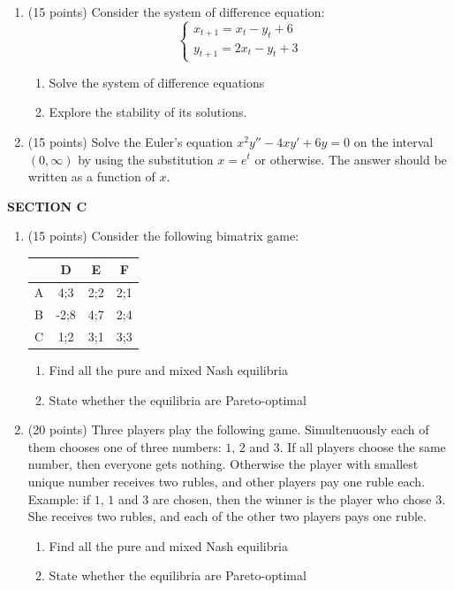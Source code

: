 \documentclass[12pt]{article} %
\theoremstyle{definition} %
\begin{document}
\begin{enumerate}[resume]
\item (15 points)  Consider the system of difference equation:
\[
\begin{cases}
x_{t+1}=x_t-y_t+6 \\
y_{t+1}=2x_t-y_t+3
\end{cases}
\]

\begin{enumerate}
\item Solve the system of difference equations
\item Explore the stability of its solutions.
\end{enumerate}

\item   (15 points)   Solve the  Euler’s equation $x^2y''-4xy'+6y=0$ on the interval $(0,\infty)$ by using the substitution $x=e^t$ or otherwise. 
The answer should be written as a function of $x$.

\end{enumerate}


\textbf{SECTION C}

\begin{enumerate}[resume]
\item  (15 points)   Consider the following bimatrix game:


\begin{tabular}{c|ccc}
 & D & E & F \\
\hline
A & 4;3 & 2;2 & 2;1  \\
B & -2;8 & 4;7 & 2;4  \\
C & 1;2 & 3;1 & 3;3  \\
\end{tabular}

\begin{enumerate}
\item Find all the pure and mixed Nash equilibria
\item State whether the equilibria are Pareto-optimal
\end{enumerate}

\item  (20 points)  Three players play the following game. Simultenuously each of them chooses one of three numbers: $1$, $2$ and $3$. If all players choose the same number, then everyone gets nothing. Otherwise the player with smallest unique number receives two rubles, and other players pay one ruble each. Example: if $1$, $1$ and $3$ are chosen, then the winner is the player who chose $3$. She receives two rubles, and  each of the other two players pays one ruble.
\begin{enumerate}
\item Find all the pure and mixed Nash equilibria
\item State whether the equilibria are Pareto-optimal
\end{enumerate}



\end{enumerate}
\end{document}
